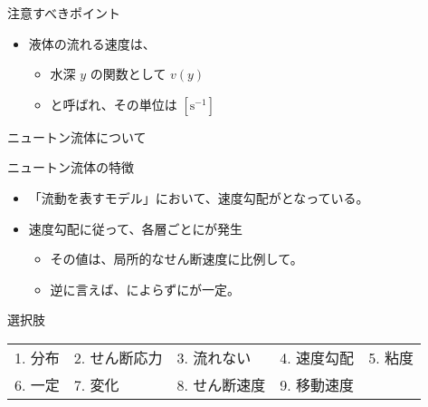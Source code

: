 \documentclass[uplatex,dvipdfmx,a4paper,11pt]{jsarticle}
\begin{document}
\begin{qlist}
\begin{qlist2}
\begin{center}
\begin{minipage}{0.9\textwidth}
\begin{center}
\begin{itembox}[l]{注意すべきポイント}
\begin{itemize}
							\begin{itemize}
								\item 水深に応じて、流れる速度の\qbox{}が生じる。
							\end{itemize}
							\item 液体の流れる速度は、
							\begin{itemize}
								\item 水深 $y$ の関数として $v(y)$
								\item \qbox{}と呼ばれ、その単位は $[\mathrm{s^{-1}}]$
							\end{itemize}
						\end{itemize}
					\end{itembox}
					\end{center}
				\end{minipage}
			\end{center}
			
			\vspace{5mm}
			\qitem ニュートン流体について
			\begin{center}
				\begin{minipage}{0.9\textwidth}
					\begin{center}
					\begin{itembox}[l]{ニュートン流体の特徴}
						\begin{itemize}
							\item 「流動を表すモデル」において、速度勾配が\qbox{}となっている。
							\item 速度勾配に従って、各層ごとに\qbox{}が発生
							\begin{itemize}
								\item その値は、局所的なせん断速度に比例して\qbox{}。
								\item 逆に言えば、\qbox{}によらずに\qbox{}が一定。
							\end{itemize}
						\end{itemize}
					\end{itembox}
					\end{center}
				\end{minipage}
			\end{center}

		\end{qlist2}

		\begin{itembox}[l]{選択肢}
			\begin{center}
				\begin{tabular}{lllll}
					1. 分布	&2. せん断応力 &3. 流れない	&4. 速度勾配	&5. 粘度\\
					6. 一定	&7. 変化  &8. せん断速度	&9. 移動速度
				\end{tabular}
			\end{center}
		\end{itembox}
\end{qlist}
\end{document}
